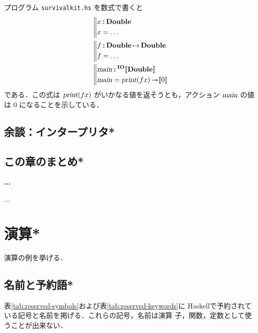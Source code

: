 \documentclass[a5paper,twoside,fleqn,draft]{jsbook}
\def\[{[\![}
\def\]{]\!]}
\newcommand{\programminglanguage}[1]{\textsf{#1}}
\newcommand{\haskell}{\programminglanguage{Haskell}}
\newenvironment{leader}{\begingroup\gt}{\endgroup}
\newenvironment{note}[1]{\begin{boxnote}\begin{center}\textbf{#1}\end{center}}{\end{boxnote}}
\newcommand{\filename}[1]{\texttt{#1}}
\newcommand{\mBrace}{\Vert}
\newcommand{\mAction}[1]{\textsl{#1}}
\DeclareMathOperator{\mMain}{\mAction{main}}
\DeclareMathOperator{\mPrint}{\mAction{print}}
\DeclareMathOperator{\mBindRightIgnore}{\twoheadrightarrow}
\DeclareMathOperator{\mFuncArrow}{\mapsto}
\DeclareMathOperator{\mIn}{{:\!:}}
\newcommand{\mType}[1]{\mathbf{#1}} %
\newcommand{\mDoubleType}{\mType{Double}}
\newcommand{\mTypeAssemble}[2]{{}^\mType{#1}\[\mType{#2}\]}
\newcommand{\mIOType}[1]{\mTypeAssemble{IO}{#1}}
\newcommand{\mIODoubleType}{\mIOType{\mDoubleType}}
\newcommand{\mPureWith}[1]{\[#1\]}
\newcommand{\mProjEXP}[2]{#1\mFuncArrow#2} %
\begin{document}
プログラム \filename{survivalkit.hs} を数式で書くと
\begin{align}
  {}&\left\mBrace
    \begin{aligned}
      x&\mIn\mDoubleType\\
      x&=\dots\\
    \end{aligned}
    \right.\\
  {}&\left\mBrace
    \begin{aligned}
      f&\mIn{}\mProjEXP{\mDoubleType}{\mDoubleType}\\
      f&=\dots\\
    \end{aligned}
    \right.\\
  {}&\left\mBrace
    \begin{aligned}
      \mMain&\mIn{}\mIODoubleType\\
      \mMain&=\mPrint(fx)\mBindRightIgnore\mPureWith{0}
    \end{aligned}
    \right.
\end{align}
である．この式は $\mPrint(fx)$ がいかなる値を返そうとも，アクション
$\mMain$ の値は $0$ になることを示している．

\section{余談：インタープリタ*}

\section{この章のまとめ*}

\begin{note}{...}
...
\end{note}

\chapter{演算*}
\label{ch:arithmetic}

\begin{leader}
演算の例を挙げる．
\end{leader}


\section{名前と予約語*}

表\ref{tab:reserved-symbols}および表\ref{tab:reserved-keywords}に
\haskell で予約されている記号と名前を掲げる．これらの記号，名前は演算
子，関数，定数として使うことが出来ない．
\end{document}
